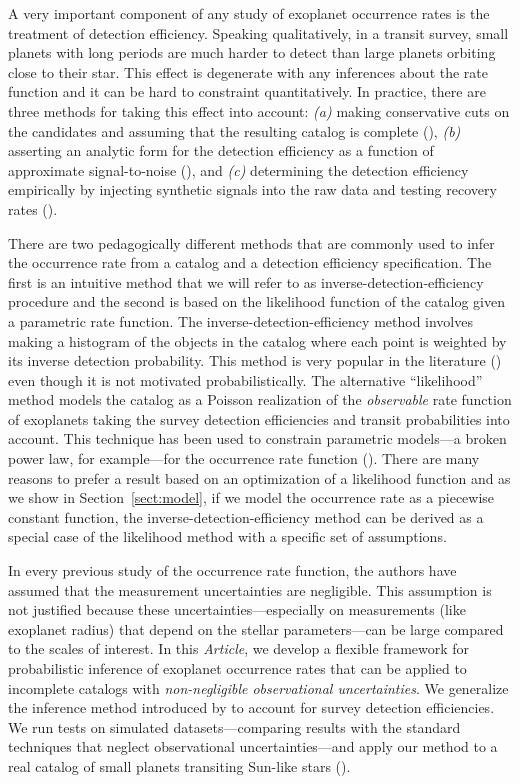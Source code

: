 \documentclass[12pt,preprint]{aastex}
\newcommand{\paper}{\textsl{Article}}
\newcommand{\Sect}[1]{Section~\ref{sect:#1}}
\newcommand{\sect}[1]{\Sect{#1}}
\begin{document}
A very important component of any study of exoplanet occurrence rates is the
treatment of detection efficiency.
Speaking qualitatively, in a transit survey, small planets with long periods
are much harder to detect than large planets orbiting close to their star.
This effect is degenerate with any inferences about the rate function and it
can be hard to constraint quantitatively.
In practice, there are three methods for taking this effect into account:
\emph{(a)} making conservative cuts on the candidates and assuming that the
resulting catalog is complete (\citealt{catanzarite, traub, tremaine}),
\emph{(b)} asserting an analytic form for the detection efficiency as a
function of approximate signal-to-noise (\citealt{youdin, howard, dressing,
dong, fressin-fp, morton-swift}), and \emph{(c)} determining the detection
efficiency empirically by injecting synthetic signals into the raw data and
testing recovery rates (\citealt{petigura-a, petigura}).

There are two pedagogically different methods that are commonly used to infer
the occurrence rate from a catalog and a detection efficiency specification.
The first is an intuitive method that we will refer to as
inverse-detection-efficiency procedure and the second is based on the
likelihood function of the catalog given a parametric rate function.
The inverse-detection-efficiency method involves making a histogram of the
objects in the catalog where each point is weighted by its inverse detection
probability.
This method is very popular in the literature (\citealt{howard, dong,
dressing, swift, petigura}) even though it is not motivated probabilistically.
The alternative ``likelihood'' method models the catalog as a Poisson
realization of the \emph{observable} rate function of exoplanets taking the
survey detection efficiencies and transit probabilities into account.
This technique has been used to constrain parametric models---a broken power
law, for example---for the occurrence rate function (\citealt{tabachnik,
youdin, dong}).
There are many reasons to prefer a result based on an optimization of a
likelihood function and as we show in \sect{model}, if we model the occurrence
rate as a piecewise constant function, the inverse-detection-efficiency method
can be derived as a special case of the likelihood method with a specific set
of assumptions.

In every previous study of the occurrence rate function, the authors have
assumed that the measurement uncertainties are negligible.
This assumption is not justified because these uncertainties---especially on
measurements (like exoplanet radius) that depend on the stellar
parameters---can be large compared to the scales of interest.
In this \paper, we develop a flexible framework for probabilistic inference of
exoplanet occurrence rates that can be applied to incomplete catalogs with
\emph{non-negligible observational uncertainties}.
We generalize the inference method introduced by \citet{hogge} to account for
survey detection efficiencies.
We run tests on simulated datasets---comparing results with the standard
techniques that neglect observational uncertainties---and apply our method to
a real catalog of small planets transiting Sun-like stars
(\citealt{petigura}).
\end{document}
